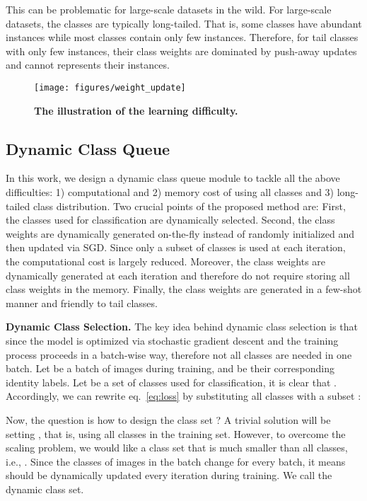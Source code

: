 \documentclass[10pt,twocolumn,letterpaper]{article}
\begin{document}
This can be problematic for large-scale datasets in the wild. For large-scale datasets, the classes are typically long-tailed. That is, some classes have abundant instances while most classes contain only few instances. Therefore, for tail classes with only few instances, their class weights are dominated by push-away updates and cannot represents their instances.

\begin{figure}[t]
   \centering
   \texttt{[image: figures/weight\_update]}
   \caption{\textbf{The illustration of the learning difficulty.} \label{fig:weight_update}}
\end{figure}

\subsection{Dynamic Class Queue} \label{sec:dcq}
In this work, we design a dynamic class queue module to tackle all the above difficulties: 1) computational and 2) memory cost of using all classes and 3) long-tailed class distribution. Two crucial points of the proposed method are: First, the classes used for classification are dynamically selected. Second, the class weights are dynamically generated on-the-fly instead of randomly initialized and then updated via SGD. Since only a subset of classes is used at each iteration, the computational cost is largely reduced. Moreover, the class weights are dynamically generated at each iteration and therefore do not require storing all class weights in the memory. Finally, the class weights are generated in a few-shot manner and friendly to tail classes.

\textbf{Dynamic Class Selection.} The key idea behind dynamic class selection is that since the model is optimized via stochastic gradient descent and the training process proceeds in a batch-wise way, therefore not all classes are needed in one batch. Let  be a batch of images during training, and  be their corresponding identity labels. Let  be a set of classes used for classification, it is clear that . Accordingly, we can rewrite eq.~\ref{eq:loss} by substituting all classes  with a subset :



Now, the question is how to design the class set ? A trivial solution will be setting , that is, using all classes in the training set. However, to overcome the scaling problem, we would like a class set that is much smaller than all classes, i.e., . Since the classes of images in the batch  change for every batch, it means  should be dynamically updated every iteration during training. We call  the dynamic class set.
\end{document}
